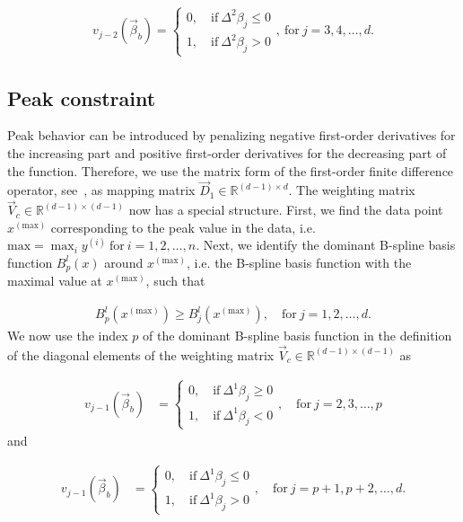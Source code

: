 \begin{align} \label{eq:weighting-matrix-conc-diagonal}
	v_{j-2}(\vec{\beta}_b) = \begin{cases}
		0, \quad \text{if} \ \Delta^2\beta_j \le 0 \\ 
		1, \quad \text{if} \ \Delta^2\beta_j > 0
	\end{cases}, \ \text{for} \ j=3,4, \dots, d.
\end{align}

\subsection{Peak constraint} \label{subsec:PeakC}

Peak behavior can be introduced by penalizing negative first-order derivatives for the increasing part and positive first-order derivatives for the decreasing part of the function. Therefore, we use the matrix form of the first-order finite difference operator, see~, as mapping matrix $\vec{D}_1 \in \mathbb{R}^{(d-1)\times d}$. The weighting matrix $\vec{V}_c \in \mathbb{R}^{(d-1) \times (d-1)}$ now has a special structure. First, we find the data point $x^{(\text{max})}$ corresponding to the peak value in the data, i.e. $\text{max} = \max_i y^{(i)} \ \text{for} \ i=1,2,\dots, n$. Next, we identify the dominant B-spline basis function $B_p^l(x)$ around $x^{(\text{max})}$, i.e. the B-spline basis function with the maximal value at $x^{(\text{max})}$, such that

\begin{align}
	B_p^l(x^{(\text{max})}) \ge B_j^l(x^{(\text{max})}), \quad \text{for} \ j=1,2,\dots,d.
\end{align} 
%
We now use the index $p$ of the dominant B-spline basis function in the definition of the diagonal elements of the weighting matrix $\vec{V}_c \in \mathbb{R}^{(d-1) \times (d-1)}$ as 

\begin{align}\label{eq:v_peak_1}
	v_{j-1}(\vec{\beta}_b) &= \begin{cases} 
		0, \quad \text{if} \ \Delta^1\beta_j \ge 0 \\ 
		1, \quad \text{if} \ \Delta^1\beta_j  < 0
	\end{cases}, \quad \text{for} \ j=2,3,\dots,p
\end{align}
%
and 

\begin{align}\label{eq:v_peak_2}
	v_{j-1}(\vec{\beta}_b) &= \begin{cases} 
		0, \quad \text{if} \ \Delta^1\beta_j \le 0 \\ 
		1, \quad \text{if} \ \Delta^1\beta_j > 0
	\end{cases}, \quad \text{for} \ j=p+1,p+2,\dots,d.
\end{align}
%
